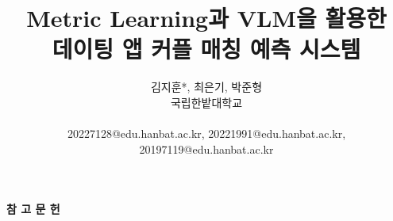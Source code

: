 \documentclass[9pt]{kics} %
\title{Metric Learning과 VLM을 활용한 \\
데이팅 앱 커플 매칭 예측 시스템
}
\author{
김지훈*, 최은기, 박준형  \\
국립한밭대학교 \\ \ \\ 
20227128@edu.hanbat.ac.kr, 20221991@edu.hanbat.ac.kr, 20197119@edu.hanbat.ac.kr
}
\begin{document}
\maketitle






\renewcommand{\refname}{}
\begin{center}
\vspace{20}
\textbf{참 고 문 헌}
\vspace{-15}
\end{center}


\end{document}
